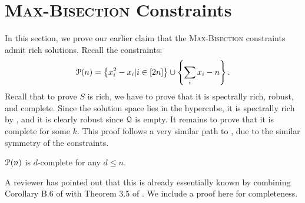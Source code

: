 \documentclass[a4paper,UKenglish]{lipics-v2016}
\begin{document}
\section{\textsc{Max-Bisection} Constraints}\label{sec:balance}
In this section, we prove our earlier claim that the \textsc{Max-Bisection} constraints admit rich solutions. Recall the constraints:
\[\mathcal P(n) = \left\{x_i^2 - x_i | i \in [2n]\right\} \cup \left\{\sum_i x_i - n\right\}.\]
Recall that to prove $S$ is rich, we have to prove that it is spectrally rich, robust, and complete. Since the solution space lies in the hypercube, it is spectrally rich by , and it is clearly robust since $\mathcal Q$ is empty. It remains to prove that it is complete for some $k$. This proof follows a very similar path to \cite{Braun:2016:MPN:2884435.2884510}, due to the similar symmetry of the constraints. 
\begin{lemma}
$\mathcal P(n)$ is $d$-complete for any $d \leq n$.
\end{lemma}
\begin{remark}
A reviewer has pointed out that this is already essentially known by combining Corollary B.6 of \cite{LPdWY16} with Theorem 3.5 of \cite{FM16}. We include a proof here for completeness.
\end{remark}
\end{document}
